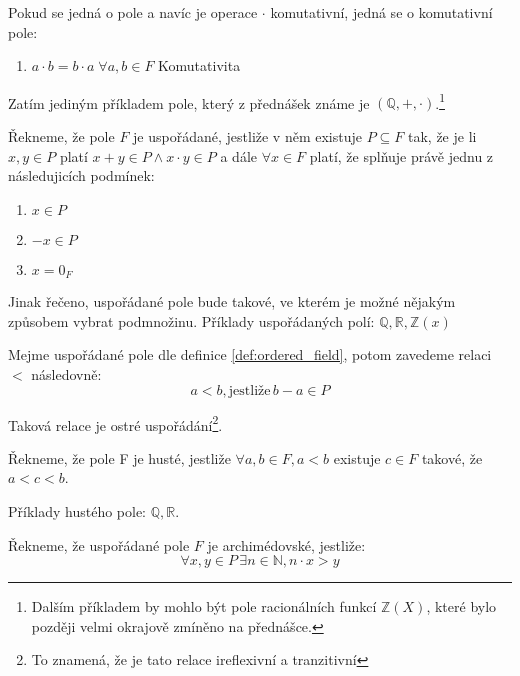 \begin{definition}
    Pokud se jedná o pole a navíc je operace $\cdot$ komutativní, jedná se o komutativní pole:
    \begin{enumerate}[start=5]
        \item $a \cdot b = b \cdot a \; \forall a, b \in F$ \hfill Komutativita
    \end{enumerate}
\end{definition}

Zatím jediným příkladem pole, který z přednášek známe je $(\mathbb{Q}, +, \cdot)$.\footnote{Dalším
příkladem by mohlo být pole racionálních funkcí $\mathbb{Z}(X)$, které bylo později velmi okrajově
zmíněno na přednášce.}

\begin{definition}
    Řekneme, že pole $F$ je uspořádané, jestliže v něm existuje $P \subseteq F$ tak, že
    je li $x, y \in P$ platí $x + y \in P \wedge x \cdot y \in P$ a dále $\forall x \in F$
    platí, že splňuje právě jednu z následujicích podmínek:
    \begin{enumerate}
        \item $x \in P$
        \item $-x \in P$
        \item $x = 0_F$
    \end{enumerate}
    \label{def:ordered_field}
\end{definition}

Jinak řečeno, uspořádané pole bude takové, ve kterém je možné nějakým způsobem vybrat 
pod\-mno\-ži\-nu. Příklady uspořádaných polí: $\mathbb{Q}, \mathbb{R}, \mathbb{Z}(x)$

Mejme uspořádané pole dle definice \ref{def:ordered_field}, potom
zavedeme relaci $<$ následovně:
$$a < b, \text{jestliže}\,b - a \in P$$

Taková relace je ostré uspořádání\footnote{To znamená, že je tato relace ireflexivní
a tranzitivní}.

\begin{definition}
    Řekneme, že pole F je husté, jestliže $\forall a, b \in F, a < b$ existuje $c \in F$
    takové, že $a < c < b$.
\end{definition}

Příklady hustého pole: $\mathbb{Q}, \mathbb{R}$.

\begin{definition}
    Řekneme, že uspořádané pole $F$ je archimédovské, jestliže:
    $$\forall x, y \in P\,\exists n\in\mathbb{N}, n \cdot x > y $$
\end{definition}

